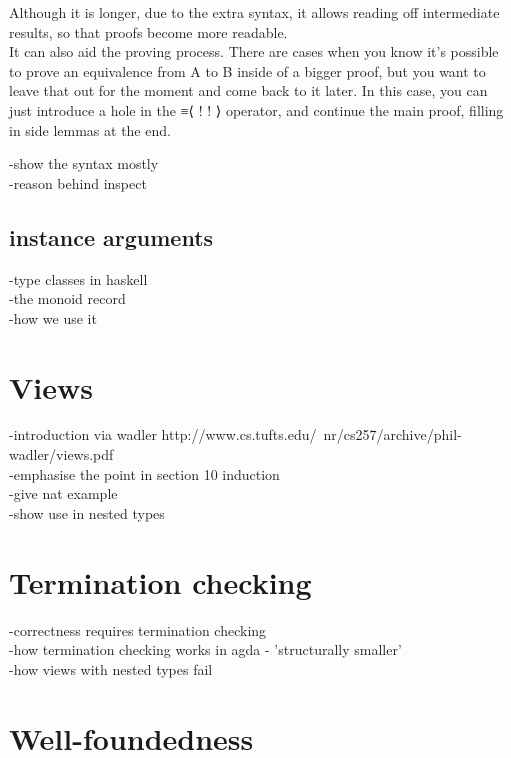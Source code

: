 \documentclass[12pt,twoside,notitlepage]{report}
\begin{document}
  Although it is longer, due to the extra syntax, it allows reading off intermediate results, so that
  proofs become more readable. \\
  It can also aid the proving process. There are cases when you know it's
  possible to prove an equivalence from A to B inside of a bigger proof, but you want to leave that out
  for the moment and come back to it later.
  In this case, you can just introduce a hole in the ≡⟨ {!   !} ⟩ operator, and continue the main proof,
  filling in side lemmas at the end.





-show the syntax mostly\\
-reason behind inspect\\



\subsection{instance arguments}

-type classes in haskell\\
-the monoid record\\
-how we use it\\

\section{Views}

-introduction via wadler http://www.cs.tufts.edu/~nr/cs257/archive/phil-wadler/views.pdf \\
-emphasise the point in section 10 induction \\
-give nat example \\
-show use in nested types \\

\section{Termination checking}

-correctness requires termination checking \\
-how termination checking works in agda - 'structurally smaller' \\
-how views with nested types fail \\

\section{Well-foundedness}
\end{document}
